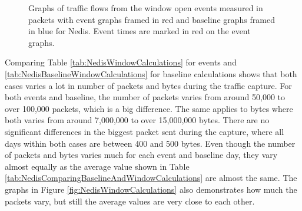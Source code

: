 \begin{figure}[H]
\begin{subfigure}[b]{0.47\textwidth}
        \centering
    \end{subfigure}
        \begin{subfigure}[b]{0.47\textwidth}
        \centering
    \end{subfigure}
    \begin{subfigure}[b]{0.47\textwidth}
        \centering
    \end{subfigure}
    \begin{subfigure}[b]{0.47\textwidth}
        \centering
    \end{subfigure}
    \hspace{0.6cm}
    \begin{subfigure}[b]{0.47\textwidth}
    \centering
        \end{subfigure}
    \caption{Graphs of traffic flows from the window open events measured in packets with event graphs framed in red and baseline graphs framed in blue for Nedis. Event times are marked in red on the event graphs.}  
    \label{fig:NedisWindowBytes2}
\end{figure}

Comparing Table \ref{tab:NedisWindowCalculations} for events and \ref{tab:NedisBaselineWindowCalculations} for baseline calculations shows that both cases varies a lot in number of packets and bytes during the traffic capture. For both events and baseline, the number of packets varies from around 50,000 to over 100,000 packets, which is a big difference. The same applies to bytes where both varies from around 7,000,000 to over 15,000,000 bytes. There are no significant differences in the biggest packet sent during the capture, where all days within both cases are between 400 and 500 bytes. Even though the number of packets and bytes varies much for each event and baseline day, they vary almost equally as the average value shown in Table \ref{tab:NedisComparingBaselineAndWindowCalculations} are almost the same. The graphs in Figure \ref{fig:NedisWindowCalculations} also demonstrates how much the packets vary, but still the average values are very close to each other. 

